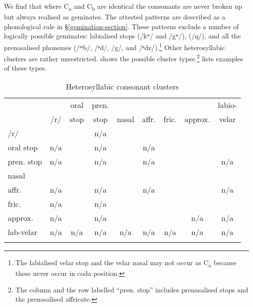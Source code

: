 We find that where C\textsubscript{a} and C\textsubscript{b} are identical the consonants are never broken up but always realised as geminates. The attested  patterns are described as a phonological rule in {\S}\ref{gemination-section}. These patterns exclude a number of logically possible geminates: labialised  stops (/kʷ/ and /{\ᵑ}gʷ/),   (/ŋ/), and all the prenasalised phonemes (/{ᵐ}b/, /{ⁿ}d/, /{\ᵑ}g/, and /{ⁿ}dz/).\footnote{The labialised velar stop and the velar nasal may not occur as C\textsubscript{a} because these never occur in coda position.} Other heterosyllabic clusters are rather unrestricted.  shows the possible cluster types.\footnote{The column and the row labelled ``pren. stop'' includes prenasalised stops and the prenasalised affricate.}  lists examples of these types.

\begin{table}[H]
\caption{Heterosyllabic consonant clusters}
\label{heterosyllcctable}
	\begin{tabularx}{\textwidth}{lCCCCCCCC}
		\lsptoprule
		&&{oral}&{pren.}&&&&&{labio-}\\
		& /r/ & {stop} & {stop} & {nasal} & {affr.} & {fric.} & {approx.} & {velar}\\ \midrule
		/r/ & \checkmark & \checkmark & n/a & \checkmark & \checkmark & \checkmark & \checkmark  & \checkmark\\
		{oral stop} & n/a & \checkmark & n/a & \checkmark & n/a & \checkmark & \checkmark  & \checkmark\\
		{pren. stop} & n/a & \checkmark & n/a & \checkmark & n/a & \checkmark & \checkmark  & n/a\\
		{nasal} & \checkmark & \checkmark & \checkmark & \checkmark & \checkmark & \checkmark & \checkmark  & \checkmark\\
		{affr.} & n/a & \checkmark & n/a & \checkmark & n/a & \checkmark & \checkmark & n/a\\
		{fric.} &  n/a & \checkmark & n/a & \checkmark & \checkmark & \checkmark & \checkmark  & \checkmark\\
		{approx.} &  n/a & \checkmark & n/a & \checkmark & \checkmark & \checkmark & n/a  & n/a\\
		{lab-velar} & n/a & n/a& n/a& n/a& n/a& n/a& n/a& n/a\\
		\lspbottomrule
	\end{tabularx}
\end{table}%

